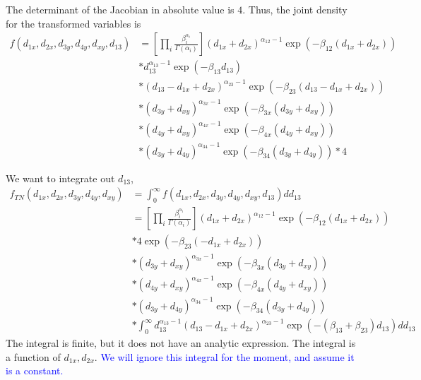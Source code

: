 \documentclass[12pt,letterpaper]{article}
\newcommand{\help}[1]{\textcolor{blue}{#1}}
\begin{document}
\begin{enumerate}
  The determinant of the Jacobian in absolute value is $4$. Thus, the
  joint density for the transformed variables is
  \begin{align*}
    f(d_{1x},d_{2x},d_{3y},d_{4y},d_{xy},d_{13}) &=
    \left[ \prod_i \frac{\beta_i^{\alpha_i}}{\Gamma(\alpha_i)} \right] (d_{1x}+d_{2x})^{\alpha_{12}-1}
    \exp{(-\beta_{12}(d_{1x}+d_{2x}))} \\
    &* d_{13}^{\alpha_{13}-1}\exp{(-\beta_{13}d_{13})} \\
    &* (d_{13}-d_{1x}+d_{2x})^{\alpha_{23}-1}\exp{(-\beta_{23}(d_{13}-d_{1x}+d_{2x}))}\\
    &* (d_{3y}+d_{xy})^{\alpha_{3x}-1}\exp{(-\beta_{3x}(d_{3y}+d_{xy}))} \\
    &*(d_{4y}+d_{xy})^{\alpha_{4x}-1}\exp{(-\beta_{4x}(d_{4y}+d_{xy}))} \\
    &* (d_{3y}+d_{4y})^{\alpha_{34}-1}\exp{(-\beta_{34}(d_{3y}+d_{4y}))} *4
  \end{align*}

  We want to integrate out $d_{13}$,
  \begin{align*}
    f_{TN}(d_{1x},d_{2x},d_{3y},d_{4y},d_{xy}) &= \int_0^\infty
    f(d_{1x},d_{2x},d_{3y},d_{4y},d_{xy},d_{13}) d d_{13} \\
    &=\left[ \prod_i \frac{\beta_i^{\alpha_i}}{\Gamma(\alpha_i)} \right] (d_{1x}+d_{2x})^{\alpha_{12}-1}
    \exp{(-\beta_{12}(d_{1x}+d_{2x}))} \\
    &* 4\exp{(-\beta_{23}(-d_{1x}+d_{2x}))}\\
    &* (d_{3y}+d_{xy})^{\alpha_{3x}-1}\exp{(-\beta_{3x}(d_{3y}+d_{xy}))} \\
    &*(d_{4y}+d_{xy})^{\alpha_{4x}-1}\exp{(-\beta_{4x}(d_{4y}+d_{xy}))} \\
    &*(d_{3y}+d_{4y})^{\alpha_{34}-1}\exp{(-\beta_{34}(d_{3y}+d_{4y}))} \\
    &* \int_0^\infty
    d_{13}^{\alpha_{13}-1}(d_{13}-d_{1x}+d_{2x})^{\alpha_{23}-1}\exp{(-(\beta_{13}+\beta_{23})d_{13})}
    d d_{13}
  \end{align*}
The integral is finite, but it does not have an analytic
expression. The integral is a function of $d_{1x},d_{2x}$. \help{We will
ignore this integral for the moment, and assume it is a constant.}
\end{enumerate}
\end{document}
